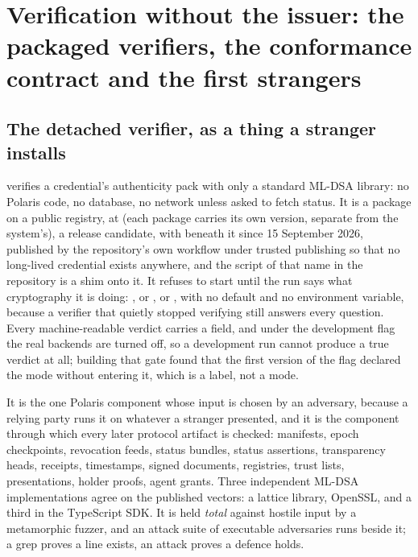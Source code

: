 \section{Verification without the issuer: the packaged verifiers, the conformance contract and the first strangers}
\label{sec:verifiers}



\subsection{The detached verifier, as a thing a stranger installs}

 verifies a credential's authenticity pack with only a standard ML-DSA
library: no Polaris code, no database, no network unless asked to fetch status. It is a package on a public registry, at  (each
package carries its own version, separate from the system's), a release candidate, with  beneath it since 15 September 2026, published by the
repository's own workflow under trusted publishing so that no long-lived credential exists anywhere,
and the script of that name in the repository is a shim onto it. It refuses to start until the run says what
cryptography it is doing: ,  or , or
, with no default and no environment variable, because a verifier that
quietly stopped verifying still answers every question. Every machine-readable verdict carries a
 field, and under the development flag the real backends are turned off, so a
development run cannot produce a true verdict at all; building that gate found that the first
version of the flag declared the mode without entering it, which is a label, not a mode. \sImpl

It is the one Polaris component whose input is chosen by an adversary, because a relying party runs
it on whatever a stranger presented, and it is the component through which every later protocol
artifact is checked: manifests, epoch checkpoints, revocation feeds, status bundles, status
assertions, transparency heads, receipts, timestamps, signed documents, registries, trust lists,
presentations, holder proofs, agent grants. Three independent ML-DSA implementations agree on the
published vectors: a lattice library, OpenSSL, and a third in the TypeScript SDK. It is held
\emph{total} against hostile input by a metamorphic fuzzer, and an attack suite of executable
adversaries runs beside it; a grep proves a line exists, an attack proves a defence holds. \sImpl

